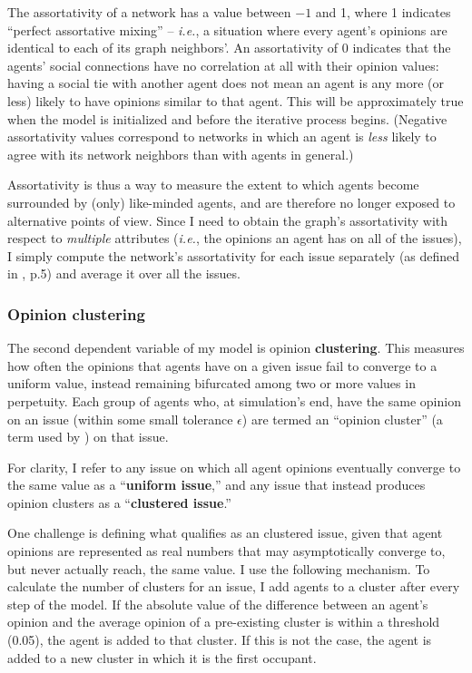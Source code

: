 The assortativity of a network has a value between $-1$ and 1, where 1
indicates ``perfect assortative mixing'' -- \textit{i.e.}, a situation where
every agent's opinions are identical to each of its graph neighbors'. An
assortativity of 0 indicates that the agents' social connections have no
correlation at all with their opinion values: having a social tie with another
agent does not mean an agent is any more (or less) likely to have opinions
similar to that agent. This will be approximately true when the model is
initialized and before the iterative process begins. (Negative assortativity
values correspond to networks in which an agent is \textit{less} likely to
agree with its network neighbors than with agents in general.)

Assortativity is thus a way to measure the extent to which agents become
surrounded by (only) like-minded agents, and are therefore no longer exposed to
alternative points of view. Since I need to obtain the graph's assortativity
with respect to \textit{multiple} attributes (\textit{i.e.}, the opinions an
agent has on all of the issues), I simply compute the network's assortativity
for each issue separately (as defined in \cite{newman_mixing_2003}, p.5) and
average it over all the issues.

\subsubsection{Opinion clustering}

The second dependent variable of my model is opinion \textbf{clustering}. This
measures how often the opinions that agents have on a given issue fail to
converge to a uniform value, instead remaining bifurcated among two or more
values in perpetuity. Each group of agents who, at simulation's end, have the
same opinion on an issue (within some small tolerance $\epsilon$) are termed an
``opinion cluster'' (a term used by \cite{fotakis_opinion_2016}) on that issue.

For clarity, I refer to any issue on which all agent opinions eventually
converge to the same value as a ``\textbf{uniform issue},'' and any issue that
instead produces opinion clusters as a ``\textbf{clustered issue}.''

One challenge is defining what qualifies as an clustered issue, given that
agent opinions are represented as real numbers that may asymptotically converge
to, but never actually reach, the same value. I use the following mechanism.
To calculate the number of clusters for an issue, I add agents to a cluster
after every step of the model. If the absolute value of the difference between
an agent's opinion and the average opinion of a pre-existing cluster is within
a threshold (0.05), the agent is added to that cluster. If this is not the
case, the agent is added to a new cluster in which it is the first occupant.


